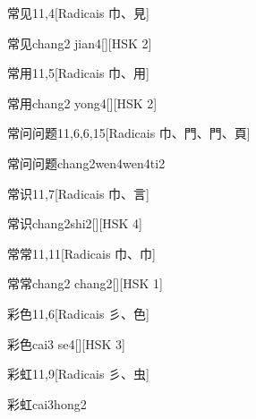 \begin{entry}{常见}{11,4}[Radicais ⼱、⾒]
  \begin{phonetics}{常见}{chang2 jian4}[][HSK 2]
  \end{phonetics}
\end{entry}

\begin{entry}{常用}{11,5}[Radicais ⼱、⽤]
  \begin{phonetics}{常用}{chang2 yong4}[][HSK 2]
  \end{phonetics}
\end{entry}

\begin{entry}{常问问题}{11,6,6,15}[Radicais ⼱、⾨、⾨、⾴]
  \begin{phonetics}{常问问题}{chang2wen4wen4ti2}
  \end{phonetics}
\end{entry}

\begin{entry}{常识}{11,7}[Radicais ⼱、⾔]
  \begin{phonetics}{常识}{chang2shi2}[][HSK 4]
  \end{phonetics}
\end{entry}

\begin{entry}{常常}{11,11}[Radicais ⼱、⼱]
  \begin{phonetics}{常常}{chang2 chang2}[][HSK 1]
  \end{phonetics}
\end{entry}

\begin{entry}{彩色}{11,6}[Radicais ⼺、⾊]
  \begin{phonetics}{彩色}{cai3 se4}[][HSK 3]
  \end{phonetics}
\end{entry}

\begin{entry}{彩虹}{11,9}[Radicais ⼺、⾍]
  \begin{phonetics}{彩虹}{cai3hong2}
  \end{phonetics}
\end{entry}

